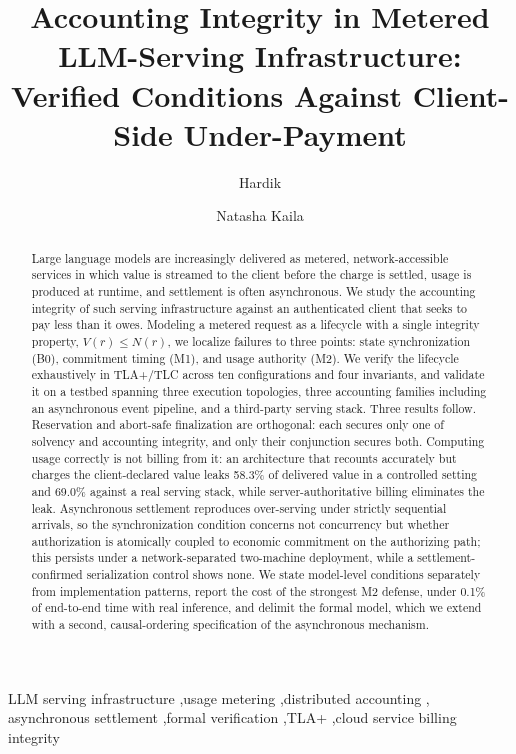 \documentclass[final,5p,times,twocolumn,number]{elsarticle}
\begin{document}
\begin{frontmatter}

\title{Accounting Integrity in Metered LLM-Serving Infrastructure:
Verified Conditions Against Client-Side Under-Payment}

\author[iitp,vipstc]{Hardik}
\author[vipstc]{Natasha Kaila}
\address[iitp]{Department of Computer Science and Data Analytics, Indian Institute of
Technology Patna, India}
\address[vipstc]{Vivekananda Institute of Professional Studies -- Technical Campus,
New Delhi, India}

\begin{abstract}
Large language models are increasingly delivered as metered, network-accessible services
in which value is streamed to the client before the charge is settled, usage is produced
at runtime, and settlement is often asynchronous. We study the accounting integrity of
such serving infrastructure against an authenticated client that seeks to pay less than
it owes. Modeling a metered request as a lifecycle with a single integrity property,
$V(r) \le N(r)$, we localize failures to three points: state synchronization (B0),
commitment timing (M1), and usage authority (M2). We verify the lifecycle exhaustively in
TLA+/TLC across ten configurations and four invariants, and validate it on a testbed
spanning three execution topologies, three accounting families including an asynchronous
event pipeline, and a third-party serving stack. Three results follow. Reservation and
abort-safe finalization are orthogonal: each secures only one of solvency and accounting
integrity, and only their conjunction secures both. Computing usage correctly is not
billing from it: an architecture that recounts accurately but charges the
client-declared value leaks 58.3\% of delivered value in a controlled setting and 69.0\%
against a real serving stack, while server-authoritative billing eliminates the leak.
Asynchronous settlement reproduces over-serving under strictly sequential arrivals, so
the synchronization condition concerns not concurrency but whether authorization is
atomically coupled to economic commitment on the authorizing path; this persists under a
network-separated two-machine deployment, while a settlement-confirmed serialization
control shows none. We state model-level conditions separately from implementation
patterns, report the cost of the strongest M2 defense, under 0.1\% of end-to-end time
with real inference, and delimit the formal model, which we extend with a second,
causal-ordering specification of the asynchronous mechanism.
\end{abstract}

\begin{keyword}
LLM serving infrastructure \sep usage metering \sep distributed accounting \sep
asynchronous settlement \sep formal verification \sep TLA+ \sep cloud service billing
integrity
\end{keyword}

\end{frontmatter}
\end{document}
